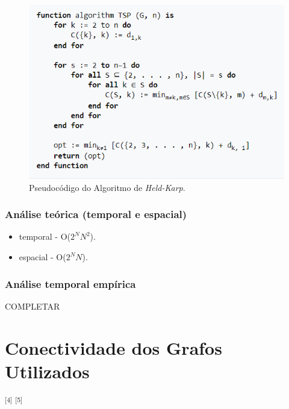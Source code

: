 \documentclass[article, a4paper, 12pt, oneside]{memoir}
\begin{document}
\begin{figure}[h!]
  \centerline{\includegraphics[scale=1]{Held-Karp Algorithm.PNG}}
  \caption{Pseudocódigo do Algoritmo de \textit{Held-Karp}.}
\end{figure}

\subsection{Análise teórica (temporal e espacial)}

\begin{itemize}
	\item temporal -  O($2^N N^2$).
	\item espacial - O($2^N N$).
\end{itemize}

\subsection{Análise temporal empírica }

{\Large COMPLETAR}
		
		
\newpage
\chapter[Conectividade dos Grafos Utilizados][Conectividade dos Grafos Utilizados]{Conectividade dos Grafos Utilizados} \label{\thechapter}

\textsuperscript{[4]} \textsuperscript{[5]}
\end{document}
